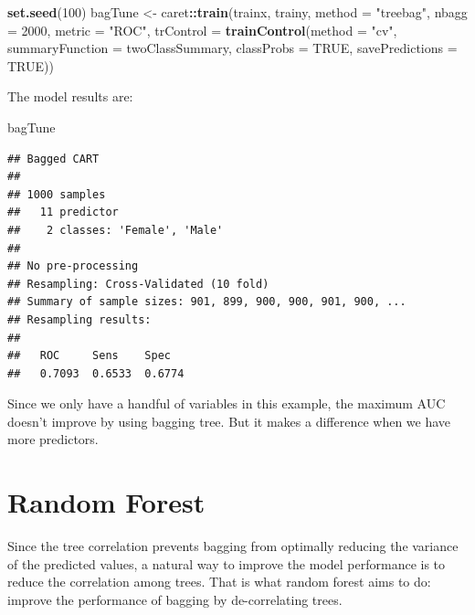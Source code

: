 \documentclass[12pt,]{krantz}
\makeatletter
\newenvironment{Shaded}{\begin{snugshade}}{\end{snugshade}}
\newcommand{\DataTypeTok}[1]{\textcolor[rgb]{0.27,0.27,0.27}{#1}}
\newcommand{\DecValTok}[1]{\textcolor[rgb]{0.06,0.06,0.06}{#1}}
\newcommand{\KeywordTok}[1]{\textcolor[rgb]{0.27,0.27,0.27}{\textbf{#1}}}
\newcommand{\NormalTok}[1]{#1}
\newcommand{\OperatorTok}[1]{\textcolor[rgb]{0.43,0.43,0.43}{\textbf{#1}}}
\newcommand{\OtherTok}[1]{\textcolor[rgb]{0.37,0.37,0.37}{#1}}
\newcommand{\StringTok}[1]{\textcolor[rgb]{0.5,0.5,0.5}{#1}}
\newenvironment{kframe}{%
\medskip{}
\setlength{\fboxsep}{.8em}
 \def\at@end@of@kframe{}%
 \ifinner\ifhmode%
  \def\at@end@of@kframe{\end{minipage}}%
  \begin{minipage}{\columnwidth}%
 \fi\fi%
 \def\FrameCommand##1{\hskip\@totalleftmargin \hskip-\fboxsep
 \colorbox{shadecolor}{##1}\hskip-\fboxsep
     \hskip-\linewidth \hskip-\@totalleftmargin \hskip\columnwidth}%
 \MakeFramed {\advance\hsize-\width
   \@totalleftmargin\z@ \linewidth\hsize
   \@setminipage}}%
 {\par\unskip\endMakeFramed%
 \at@end@of@kframe}
\renewenvironment{Shaded}{\begin{kframe}}{\end{kframe}}
\makeatother
\begin{document}
\begin{Shaded}
\begin{Highlighting}[]
\KeywordTok{set.seed}\NormalTok{(}\DecValTok{100}\NormalTok{)}
\NormalTok{bagTune <-}\StringTok{ }\NormalTok{caret}\OperatorTok{::}\KeywordTok{train}\NormalTok{(trainx, trainy, }
                           \DataTypeTok{method =} \StringTok{"treebag"}\NormalTok{,}
                           \DataTypeTok{nbagg =} \DecValTok{2000}\NormalTok{,}
                           \DataTypeTok{metric =} \StringTok{"ROC"}\NormalTok{,}
                           \DataTypeTok{trControl =} \KeywordTok{trainControl}\NormalTok{(}\DataTypeTok{method =} \StringTok{"cv"}\NormalTok{,}
                           \DataTypeTok{summaryFunction =}\NormalTok{ twoClassSummary,}
                           \DataTypeTok{classProbs =} \OtherTok{TRUE}\NormalTok{,}
                           \DataTypeTok{savePredictions =} \OtherTok{TRUE}\NormalTok{))}
\end{Highlighting}
\end{Shaded}

The model results are:

\begin{Shaded}
\begin{Highlighting}[]
\NormalTok{bagTune}
\end{Highlighting}
\end{Shaded}

\begin{verbatim}
## Bagged CART 
## 
## 1000 samples
##   11 predictor
##    2 classes: 'Female', 'Male' 
## 
## No pre-processing
## Resampling: Cross-Validated (10 fold) 
## Summary of sample sizes: 901, 899, 900, 900, 901, 900, ... 
## Resampling results:
## 
##   ROC     Sens    Spec  
##   0.7093  0.6533  0.6774
\end{verbatim}

Since we only have a handful of variables in this example, the maximum AUC doesn't improve by using bagging tree. But it makes a difference when we have more predictors.

\hypertarget{random-forest}{%
\section{Random Forest}\label{random-forest}}

Since the tree correlation prevents bagging from optimally reducing the variance of the predicted values, a natural way to improve the model performance is to reduce the correlation among trees. That is what random forest aims to do: improve the performance of bagging by de-correlating trees.
\end{document}
